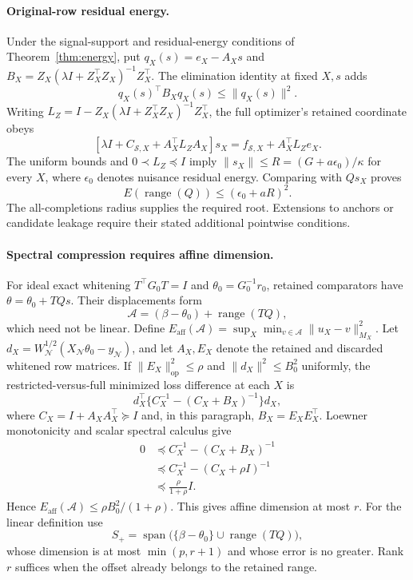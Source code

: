 \paragraph{Original-row residual energy.}
Under the signal-support and residual-energy conditions of Theorem~\ref{thm:energy}, put $q_X(s)=e_X-A_Xs$ and $B_X=Z_X(\lambda I+Z_X^\top Z_X)^{-1}Z_X^\top$. The elimination identity at fixed $X,s$ adds
\[
 q_X(s)^\top B_Xq_X(s)\leq\|q_X(s)\|^2.
\]
Writing $L_Z=I-Z_X(\lambda I+Z_X^\top Z_X)^{-1}Z_X^\top$, the full optimizer's retained coordinate obeys
\[
 [\lambda I+C_{\mathcal S,X}+A_X^\top L_ZA_X]s_X
 =f_{\mathcal S,X}+A_X^\top L_Ze_X.
\]
The uniform bounds and $0\prec L_Z\preceq I$ imply $\|s_X\|\leq R=(G+a\epsilon_0)/\kappa$ for every $X$, where $\epsilon_0$ denotes nuisance residual energy. Comparing with $Qs_X$ proves
\[
 E(\operatorname{range}(Q))\leq(\epsilon_0+aR)^2.
\]
The all-completions radius supplies the required root. Extensions to anchors or candidate leakage require their stated additional pointwise conditions.

\paragraph{Spectral compression requires affine dimension.}
For ideal exact whitening $T^\top G_0T=I$ and $\theta_0=G_0^{-1}r_0$, retained comparators have $\theta=\theta_0+TQs$. Their displacements form
\[
 \mathcal A=(\beta-\theta_0)+\operatorname{range}(TQ),
\]
which need not be linear. Define $E_{\mathrm{aff}}(\mathcal A)=\sup_X\min_{v\in\mathcal A}\|u_X-v\|_{M_X}^2$. Let $d_X=W_{\mathcal N}^{1/2}(X_{\mathcal N}\theta_0-y_{\mathcal N})$, and let $A_X,E_X$ denote the retained and discarded whitened row matrices. If $\|E_X\|_{\mathrm{op}}^2\leq\rho$ and $\|d_X\|^2\leq B_0^2$ uniformly, the restricted-versus-full minimized loss difference at each $X$ is
\[
 d_X^\top\{C_X^{-1}-(C_X+B_X)^{-1}\}d_X,
\]
where $C_X=I+A_XA_X^\top\succeq I$ and, in this paragraph, $B_X=E_XE_X^\top$. Loewner monotonicity and scalar spectral calculus give
\begin{align*}
 0&\preceq C_X^{-1}-(C_X+B_X)^{-1}\\
 &\preceq C_X^{-1}-(C_X+\rho I)^{-1}\\
 &\preceq\frac{\rho}{1+\rho}I.
\end{align*}
Hence $E_{\mathrm{aff}}(\mathcal A)\leq\rho B_0^2/(1+\rho)$. This gives affine dimension at most $r$. For the linear definition use
\[
 S_+=\operatorname{span}\bigl(\{\beta-\theta_0\}\cup\operatorname{range}(TQ)\bigr),
\]
whose dimension is at most $\min(p,r+1)$ and whose error is no greater. Rank $r$ suffices when the offset already belongs to the retained range.

